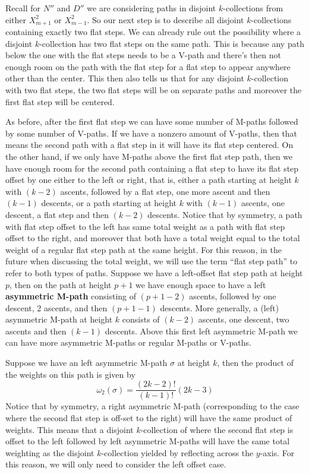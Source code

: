\documentclass[11pt]{article}
\theoremstyle{definition}
\theoremstyle{definition}
\theoremstyle{plain}
\theoremstyle{plain}
\theoremstyle{plain}
\theoremstyle{definition}
\begin{document}
Recall for $N''$ and $D''$ we are considering paths in disjoint $k$-collections from either $X_{m+1}^2$ or $X_{m-1}^2$. So our next step is to describe all disjoint $k$-collections containing exactly two flat steps. We can already rule out the possibility where a disjoint $k$-collection has two flat steps on the same path. This is because any path below the one with the flat steps needs to be a V-path and there's then not enough room on the path with the flat step for a flat step to appear anywhere other than the center. This then also tells us that for any disjoint $k$-collection with two flat steps, the two flat steps will be on separate paths and moreover the first flat step will be centered.

As before, after the first flat step we can have some number of M-paths followed by some number of V-paths. If we have a nonzero amount of V-paths, then that means the second path with a flat step in it will have its flat step centered. On the other hand, if we only have M-paths above the first flat step path, then we have enough room for the second path containing a flat step to have its flat step offset by one either to the left or right, that is, either a path starting at height $k$ with $(k-2)$ ascents, followed by a flat step, one more ascent and then $(k-1)$ descents, or a path starting at height $k$ with $(k-1)$ ascents, one descent, a flat step and then $(k-2)$ descents. Notice that by symmetry, a path with flat step offset to the left has same total weight as a path with flat step offset to the right, and moreover that both have a total weight  equal to the total weight of a regular flat step path at the same height. For this reason, in the future when discussing the total weight, we will use the term ``flat step path'' to refer to both types of paths. Suppose we have a left-offset flat step path at height $p$, then on the path at height $p+1$ we have enough space to have a left \textbf{asymmetric M-path} consisting of $(p+1-2)$ ascents, followed by one descent, 2 ascents, and then $(p+1-1)$ descents. More generally, a (left) asymmetric M-path at height $k$ consists of $(k-2)$ ascents, one descent, two ascents and then $(k-1)$ descents. Above this first left asymmetric M-path we can have more asymmetric M-paths or regular M-paths or V-paths.

Suppose we have an left asymmetric M-path $\sigma$ at height $k$, then the product of the weights on this path is given by
\begin{equation*}
\omega_2(\sigma) = \frac{(2k-2)!}{(k-1)!}(2k-3)
\end{equation*}
Notice that by symmetry, a right asymmetric M-path (corresponding to the case where the second flat step is off-set to the right) will have the same product of weights. This means that a disjoint $k$-collection of where the second flat step is offset to the left followed by left asymmetric M-paths will have the same total weighting as the disjoint $k$-collection yielded by reflecting across the $y$-axis. For this reason, we will only need to consider the left offset case.
\end{document}
